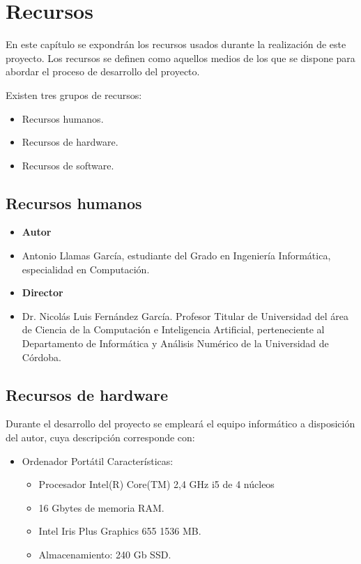 \chapter{Recursos}

En este capítulo se expondrán los recursos usados durante la realización de este proyecto. Los recursos se definen como aquellos medios de los que se dispone para abordar el proceso de desarrollo del proyecto.

Existen tres grupos de recursos:

 \begin{itemize}
     \item Recursos humanos.
     \item Recursos de hardware.
     \item Recursos de software.
 \end{itemize}


 \section{Recursos humanos}
 \begin{itemize}
     \item \textbf{Autor}
     \item[] Antonio Llamas García, estudiante del Grado en Ingeniería Informática, especialidad en Computación.
    
     \item \textbf{Director}
     \item[] Dr. Nicolás Luis Fernández García. Profesor Titular de Universidad del área de Ciencia de la Computación e Inteligencia Artificial, perteneciente al Departamento de Informática y Análisis Numérico de la Universidad de Córdoba.
 \end{itemize}

\section{Recursos de hardware}
 Durante el desarrollo del proyecto se empleará el equipo informático a disposición del autor, cuya descripción corresponde con:
  \begin{itemize}
      \item Ordenador Portátil Características:
      \begin{itemize}
         \item Procesador Intel(R) Core(TM) 2,4 GHz i5 de 4 núcleos
         \item 16 Gbytes de memoria RAM.
         \item Intel Iris Plus Graphics 655 1536 MB.
         \item Almacenamiento: 240 Gb SSD.
      \end{itemize}
  \end{itemize}

